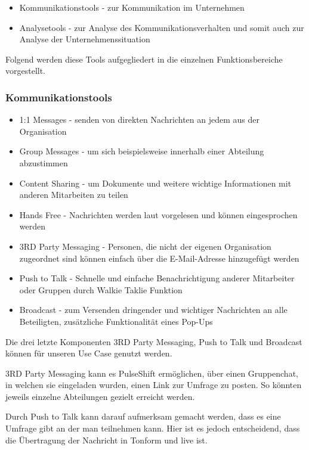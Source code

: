 \begin{itemize}
\item Kommunikationstools - zur Kommunikation im Unternehmen 
\item Analysetools - zur Analyse des Kommunikationsverhalten und somit auch zur Analyse der Unternehmenssituation
\end{itemize}

Folgend werden diese Tools aufgegliedert in die einzelnen Funktionsbereiche vorgestellt.

\subsubsection{Kommunikationstools}

\begin{itemize}
\item 1:1 Messages - senden von direkten Nachrichten an jedem aus der Organisation
\item Group Messages - um sich beispielsweise innerhalb einer Abteilung abzustimmen
\item Content Sharing - um Dokumente und weitere wichtige Informationen mit anderen Mitarbeiten zu teilen
\item Hands Free - Nachrichten werden laut vorgelesen und können eingesprochen werden
\item 3RD Party Messaging - Personen, die nicht der eigenen Organisation zugeordnet sind können einfach über die E-Mail-Adresse hinzugefügt werden
\item Push to Talk - Schnelle und einfache Benachrichtigung anderer Mitarbeiter oder Gruppen durch Walkie Taklie Funktion
\item Broadcast - zum Versenden dringender und wichtiger Nachrichten an alle Beteiligten, zusätzliche Funktionalität eines Pop-Ups
\end{itemize}

Die drei letzte Komponenten 3RD Party Messaging, Push to Talk und Broadcast können für unseren Use Case genutzt werden.

3RD Party Messaging kann es PulseShift ermöglichen, über einen Gruppenchat, in welchen sie eingeladen wurden, einen Link zur Umfrage zu posten. So könnten jeweils einzelne Abteilungen gezielt erreicht werden.

Durch Push to Talk kann darauf aufmerksam gemacht werden, dass es eine Umfrage gibt an der man teilnehmen kann. Hier ist es jedoch entscheidend, dass die Übertragung der Nachricht in Tonform und live ist. 


